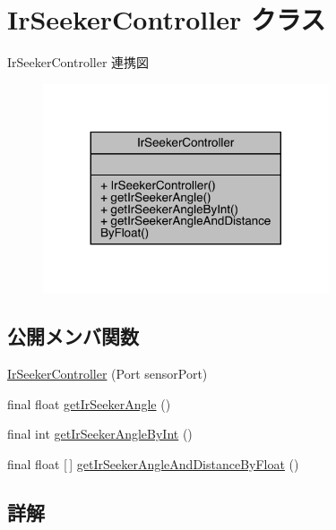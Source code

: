 \hypertarget{class_ir_seeker_controller}{}\section{Ir\+Seeker\+Controller クラス}
\label{class_ir_seeker_controller}


Ir\+Seeker\+Controller 連携図\nopagebreak
\begin{figure}[H]
\begin{center}
\leavevmode
\includegraphics[width=239pt]{d0/d4d/class_ir_seeker_controller__coll__graph}
\end{center}
\end{figure}
\subsection*{公開メンバ関数}
\begin{DoxyCompactItemize}
\item 
\mbox{\hyperlink{class_ir_seeker_controller_a5013fb830f68f74855f46d6748af1a71}{Ir\+Seeker\+Controller}} (Port sensor\+Port)
\item 
final float \mbox{\hyperlink{class_ir_seeker_controller_a71fb9a9096eebd286ef0f02c6f603468}{get\+Ir\+Seeker\+Angle}} ()
\item 
final int \mbox{\hyperlink{class_ir_seeker_controller_ae8eeef8c000dbea552f843f8b97630e7}{get\+Ir\+Seeker\+Angle\+By\+Int}} ()
\item 
final float \mbox{[}$\,$\mbox{]} \mbox{\hyperlink{class_ir_seeker_controller_a554c0174b99e64201156d05434781bb3}{get\+Ir\+Seeker\+Angle\+And\+Distance\+By\+Float}} ()
\end{DoxyCompactItemize}


\subsection{詳解}


